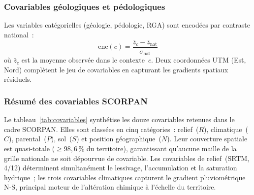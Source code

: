 \documentclass[10pt,a4paper,twocolumn]{article}
\begin{document}
	\subsubsection{Covariables géologiques et pédologiques}
	
	Les variables catégorielles (géologie, pédologie, RGA) sont encodées
	par contraste national~:
	\begin{equation}
		\mathrm{enc}(c)=\frac{\bar{z}_c-\bar{z}_{\mathrm{nat}}}{\sigma_{\mathrm{nat}}}
		\label{eq:encoding}
	\end{equation}
	où $\bar{z}_c$ est la moyenne observée dans le contexte~$c$.
	Deux coordonnées UTM (Est, Nord) complètent le jeu de covariables
	en capturant les gradients spatiaux résiduels.
	
	\subsubsection{Résumé des covariables SCORPAN}

	Le tableau~\ref{tab:covariables} synthétise les douze covariables
	retenues dans le cadre SCORPAN. Elles sont classées en cinq
	catégories~: relief~($R$), climatique~($C$), parental~($P$),
	sol~($S$) et position géographique~($N$).
	Leur couverture spatiale est quasi-totale
	(${}\geq98{,}6$\,\% du territoire), garantissant qu'aucune maille
	de la grille nationale ne soit dépourvue de covariable.
	Les covariables de relief~(SRTM, 4/12) déterminent
	simultanément le lessivage, l'accumulation et la saturation
	hydrique~; les trois covariables climatiques capturent
	le gradient pluviométrique N-S, principal moteur de l'altération
	chimique à l'échelle du territoire.
\end{document}
